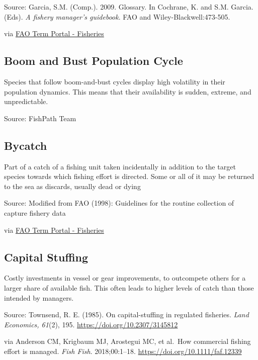 \documentclass[
  11pt,
]{book}
\begin{document}
Source: Garcia, S.M. (Comp.). 2009. Glossary. In Cochrane, K. and S.M. Garcia. (Eds). \emph{A fishery manager's guidebook}. FAO and Wiley-Blackwell:473-505.

via \href{http://www.fao.org/fishery/glossary/en}{FAO Term Portal - Fisheries}

\hypertarget{boom-and-bust-population-cycle}{%
\subsection{Boom and Bust Population Cycle}\label{boom-and-bust-population-cycle}}

Species that follow boom-and-bust cycles display high volatility in their population dynamics. This means that their availability is sudden, extreme, and unpredictable.

Source: FishPath Team

\hypertarget{bycatch}{%
\subsection{Bycatch}\label{bycatch}}

Part of a catch of a fishing unit taken incidentally in addition to the target species towards which fishing effort is directed. Some or all of it may be returned to the sea as discards, usually dead or dying

Source: Modified from FAO (1998): Guidelines for the routine collection of capture fishery data

via \href{http://www.fao.org/fishery/glossary/en}{FAO Term Portal - Fisheries}

\hypertarget{capital-stuffing}{%
\subsection{Capital Stuffing}\label{capital-stuffing}}

Costly investments in vessel or gear improvements, to outcompete others for a larger share of available fish. This often leads to higher levels of catch than those intended by managers.

Source: Townsend, R. E. (1985). On capital-stuffing in regulated fisheries. \emph{Land
Economics, 61}(2), 195. \url{https://doi.org/10.2307/3145812}

via Anderson CM, Krigbaum MJ,
Arostegui MC, et al.~How commercial fishing effort is managed. \emph{Fish Fish}. 2018;00:1--18. \url{https://doi.org/10.1111/faf.12339}
\end{document}

